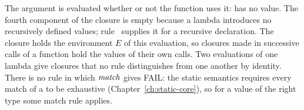 

  {}

  {}

  {}

\begin{rulecomments}
 The argument is evaluated whether or not the
function uses it:  has no
value.
 The fourth component of the closure is empty
because a lambda introduces no recursively defined values;
rule~ supplies it for a recursive declaration. The
closure holds the environment $E$ of this evaluation, so closures made in
successive calls of a function hold the values of their own calls. Two
evaluations of one lambda give closures that no rule distinguishes from one
another by identity. %
 There is no rule in which $\mathit{match}$ gives FAIL: the
static semantics requires every match of a  to be exhaustive
(Chapter~\ref{ch:static-core}), so for a value of the right type some match
rule applies.
\end{rulecomments}

\label{sec:dynamic-core-apply}

  {}

  {}

  {}

  {}

